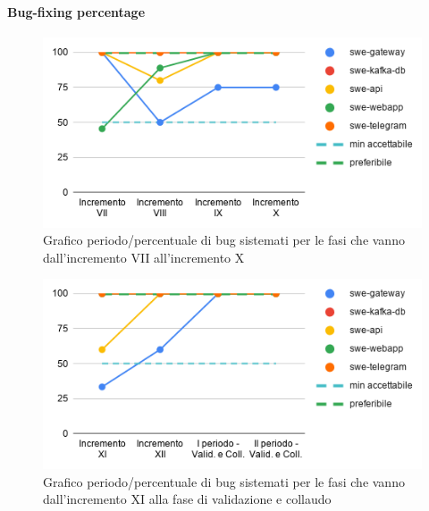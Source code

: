 \paragraph{Bug-fixing percentage}
	\begin{figure}[H]
			\centering
			\includegraphics[width=0.8\linewidth]{./res/images/QM-TEST-6-BFP.png}
			\caption{Grafico periodo/percentuale di bug sistemati per le fasi che vanno dall'incremento VII all'incremento X}
			\label{fig:Grafico periodo/percentuale di bug sistemati per le fasi che vanno dall'incremento VII all'incremento X}
	\end{figure}
	\begin{figure}[H]
			\centering
			\includegraphics[width=0.8\linewidth]{./res/images/QM-TEST-6-BFP_1.png}
			\caption{Grafico periodo/percentuale di bug sistemati per le fasi che vanno dall'incremento XI alla fase di validazione e collaudo}
			\label{fig:Grafico periodo/percentuale di bug sistemati per le fasi che vanno dall'incremento XI alla fase di validazione e collaudo}
	\end{figure}

